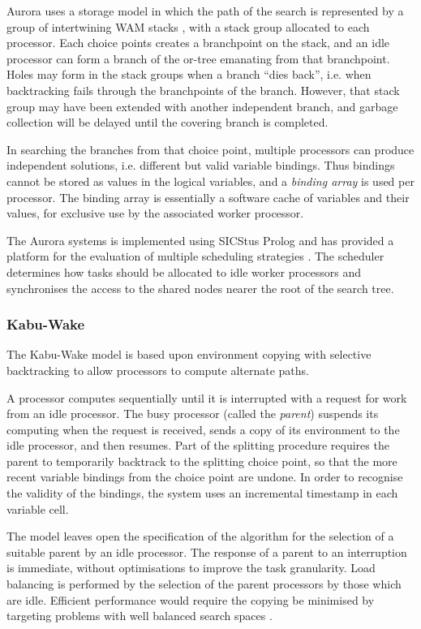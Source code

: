 Aurora uses a storage model in which the path of the search is represented
by a group of intertwining WAM stacks \cite{Tic91}, with a stack group allocated
to each processor.  Each choice points creates a branchpoint on the stack, and
an idle processor can form a branch of the or-tree emanating from that branchpoint.
Holes may form in the stack groups when a branch ``dies back'', i.e. when
backtracking fails through the branchpoints of the branch.  However, that 
stack group may have been extended with another independent branch, and garbage
collection will be delayed until the covering branch is completed.

In searching the branches from that choice point, multiple processors can
produce independent solutions, i.e. different but valid variable bindings.  Thus
bindings cannot be stored as values in the logical variables,  and a \textit{binding
array} is used per processor.  The binding array is essentially a software cache
of variables and their values, for exclusive use by the associated worker processor.

The Aurora systems is implemented using SICStus Prolog \cite{BBP+94} and has
provided a platform for the evaluation of multiple scheduling strategies
\cite{Bea91}.  The scheduler determines how tasks should be allocated to idle
worker processors and synchronises the access to the shared nodes nearer the
root of the search tree.

\subsubsection{Kabu-Wake}


The Kabu-Wake model \cite{MKI+86}
is based upon environment copying with selective backtracking
to allow processors to compute alternate paths.

A processor computes sequentially until it is interrupted with a request for
work from an idle processor.  The busy processor (called the \textit{parent}) suspends
its computing when the request is received, sends a copy of its environment to the
idle processor, and then resumes.  Part of the splitting procedure requires the
parent to temporarily backtrack to the splitting choice point, so that the more
recent variable bindings from the choice point are undone.  In order to recognise
the validity of the bindings, the system uses an incremental timestamp in each
variable cell.

The model leaves open the
specification of the algorithm for the selection of a suitable parent
by an idle processor.
The response of a parent to an interruption is immediate, without
optimisations to improve the task granularity.
Load balancing is performed by the selection of the parent
processors by those which are idle.  Efficient performance would require the copying
be minimised by targeting problems with well balanced search spaces \cite{DR92}.

